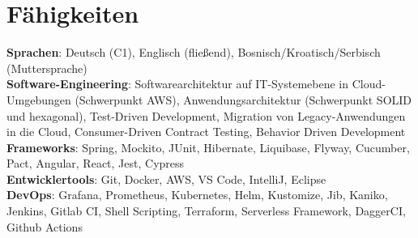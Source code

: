 \documentclass[a4paper,12pt]{article}
\begin{document}
	\section{Fähigkeiten}
	\begin{itemize}[leftmargin=0.15in, label={}]
		\small{
			\item{
				\textbf{Sprachen}{: Deutsch (C1), Englisch (fließend), Bosnisch/Kroatisch/Serbisch (Muttersprache)} \\
				\textbf{Software-Engineering}{: Softwarearchitektur auf IT-Systemebene in Cloud-Umgebungen (Schwerpunkt AWS),
					Anwendungsarchitektur (Schwerpunkt SOLID und hexagonal), Test-Driven Development, Migration von
					Legacy-Anwendungen in die Cloud, Consumer-Driven Contract Testing, Behavior Driven Development} \\
					\textbf{Frameworks}{: Spring, Mockito, JUnit, Hibernate, Liquibase, Flyway, Cucumber, Pact, Angular, React, Jest, Cypress} \\
					\textbf{Entwicklertools}{: Git, Docker, AWS, VS Code, IntelliJ, Eclipse} \\
					\textbf{DevOps}{: Grafana, Prometheus, Kubernetes, Helm, Kustomize, Jib, Kaniko, Jenkins, Gitlab CI, Shell Scripting, Terraform, Serverless Framework, DaggerCI, Github Actions}
			}}
		\end{itemize}
	
\end{document}
